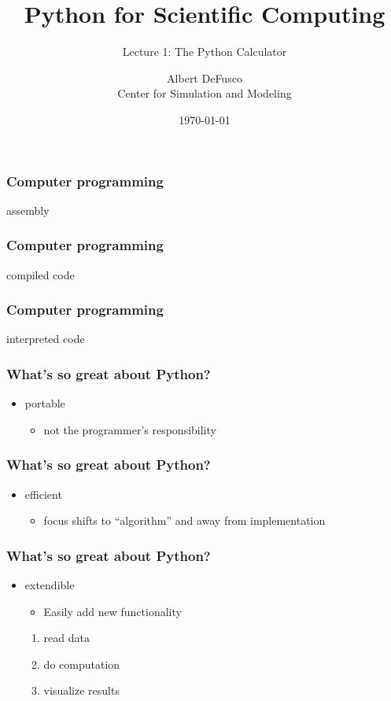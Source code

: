 \documentclass[xcolor=table,10pt,final]{beamer}
\begin{document}
\title{Python for Scientific Computing}
\subtitle{Lecture 1: The Python Calculator}
\author{Albert DeFusco\\Center for Simulation and Modeling}
\date{\today}
\frame{\titlepage}

\begin{frame}
  \frametitle{Computer programming}
    assembly
\end{frame}
\begin{frame}
  \frametitle{Computer programming}
compiled code
\end{frame}
\begin{frame}
  \frametitle{Computer programming}
  interpreted code
\end{frame}

\begin{frame}
  \frametitle{What's so great about Python?}
  \begin{itemize}
    \item portable
      \begin{itemize}
        \item not the programmer's responsibility
      \end{itemize}
  \end{itemize}
\end{frame}
\begin{frame}
  \frametitle{What's so great about Python?}
  \begin{itemize}
    \item efficient
      \begin{itemize}
        \item focus shifts to ``algorithm'' and away from implementation
      \end{itemize}
  \end{itemize}
\end{frame}
\begin{frame}
  \frametitle{What's so great about Python?}
  \begin{itemize}
    \item extendible
      \begin{itemize}
        \item Easily add new functionality
      \end{itemize}
      \begin{enumerate}
        \item read data
        \item do computation
        \item visualize results
      \end{enumerate}
  \end{itemize}
\end{frame}
\end{document}
